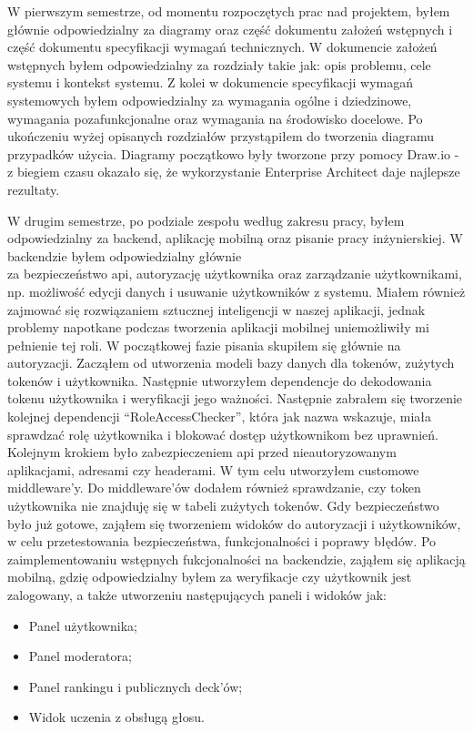 W pierwszym semestrze, od momentu rozpoczętych prac nad projektem, byłem głównie odpowiedzialny za diagramy oraz część
dokumentu założeń wstępnych i część dokumentu specyfikacji wymagań technicznych. W dokumencie założeń wstępnych byłem
odpowiedzialny za rozdziały takie jak: opis problemu, cele systemu i kontekst systemu. Z kolei w dokumencie
specyfikacji wymagań systemowych byłem odpowiedzialny za wymagania ogólne i dziedzinowe, wymagania pozafunkcjonalne
oraz wymagania na środowisko docelowe. Po ukończeniu wyżej opisanych rozdziałów przystąpiłem do tworzenia diagramu
przypadków użycia. Diagramy początkowo były tworzone przy pomocy Draw.io - z biegiem czasu okazało się, że wykorzystanie Enterprise Architect daje najlepsze rezultaty.
\par W drugim semestrze, po podziale zespołu według zakresu pracy, byłem odpowiedzialny za backend, aplikację
mobilną oraz pisanie pracy inżynierskiej. W backendzie byłem odpowiedzialny głównie\\ za bezpieczeństwo api, autoryzację
użytkownika oraz zarządzanie użytkownikami, np. możliwość edycji danych i usuwanie użytkowników z systemu.
Miałem również zajmować się rozwiązaniem sztucznej inteligencji w naszej aplikacji, jednak problemy napotkane podczas
tworzenia aplikacji mobilnej uniemożliwiły mi pełnienie tej roli. W początkowej fazie pisania skupiłem się głównie na
autoryzacji. Zacząłem od utworzenia modeli bazy danych dla tokenów, zużytych tokenów i użytkownika. Następnie
utworzyłem dependencje do dekodowania tokenu użytkownika i weryfikacji jego ważności. Następnie zabrałem się tworzenie
kolejnej dependencji “RoleAccessChecker”, która jak nazwa wskazuje, miała sprawdzać rolę użytkownika i blokować dostęp
użytkownikom bez uprawnień. Kolejnym krokiem było zabezpieczeniem api przed nieautoryzowanym aplikacjami, adresami czy
headerami. W tym celu utworzyłem customowe middleware’y. Do middleware’ów dodałem również sprawdzanie, czy token
użytkownika nie znajduję się w tabeli zużytych tokenów. Gdy bezpieczeństwo było już gotowe, zająłem się tworzeniem
widoków do autoryzacji i użytkowników, w celu przetestowania bezpieczeństwa, funkcjonalności i poprawy błędów.
Po zaimplementowaniu wstępnych fukcjonalności na backendzie, zająłem się aplikacją mobilną, gdzię odpowiedzialny byłem
za weryfikacje czy użytkownik jest zalogowany, a także utworzeniu następujących paneli i widoków jak:

\begin{itemize}
    \item Panel użytkownika;
    \item Panel moderatora;
    \item Panel rankingu i publicznych deck’ów;
    \item Widok uczenia z obsługą głosu.
\end{itemize}

